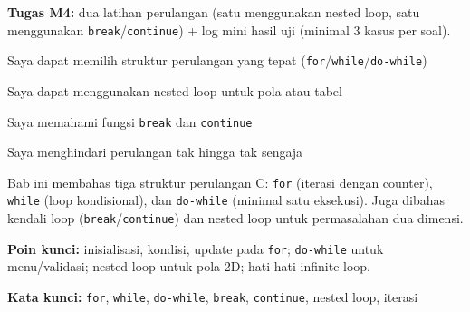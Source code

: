 \documentclass[../main.tex]{subfiles}
\begin{document}
\begin{asesmen}
\textbf{Tugas M4:} dua latihan perulangan (satu menggunakan nested loop, satu menggunakan \texttt{break}/\texttt{continue}) + log mini hasil uji (minimal 3 kasus per soal).
\end{asesmen}

\begin{checklist}
  \item Saya dapat memilih struktur perulangan yang tepat (\texttt{for}/\texttt{while}/\texttt{do-while})
  \item Saya dapat menggunakan nested loop untuk pola atau tabel
  \item Saya memahami fungsi \texttt{break} dan \texttt{continue}
  \item Saya menghindari perulangan tak hingga tak sengaja
\end{checklist}

\begin{rangkuman}
Bab ini membahas tiga struktur perulangan C: \texttt{for} (iterasi dengan counter), \texttt{while} (loop kondisional), dan \texttt{do-while} (minimal satu eksekusi). Juga dibahas kendali loop (\texttt{break}/\texttt{continue}) dan nested loop untuk permasalahan dua dimensi.

\textbf{Poin kunci:} inisialisasi, kondisi, update pada \texttt{for}; \texttt{do-while} untuk menu/validasi; nested loop untuk pola 2D; hati-hati infinite loop.

\textbf{Kata kunci:} \texttt{for}, \texttt{while}, \texttt{do-while}, \texttt{break}, \texttt{continue}, nested loop, iterasi
\end{rangkuman}
\end{document}
